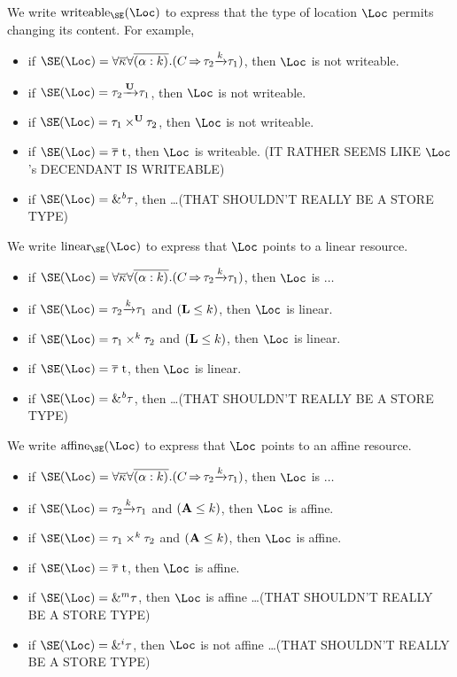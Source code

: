 We write $\Writeable\SE\Loc$ to express that the type of location
$\Loc$ permits changing its content. For example,
\begin{itemize}
\item if $\SE (\Loc) =
  \forall\Multi\kvar\forall\Multi{\bvar{\alpha}{k}}.(\qual{C}{\tau_2\tarr{k}\tau_1})$,
  then $\Loc$ is not writeable.
\item if $\SE (\Loc) = \tau_2\tarr{\kun}{\tau_1}$, then $\Loc$ is not
  writeable.
\item if $\SE (\Loc) = \tyPair[\kun]{\tau_1}{\tau_2}$, then $\Loc$ is not writeable.
\item if $\SE (\Loc) = \tapp{t}{\Multi\tau}$, then $\Loc$ is
  writeable. (IT RATHER SEEMS LIKE $\Loc$'s DECENDANT IS WRITEABLE)
\item if $\SE (\Loc) = \borrow\tau$, then \dots (THAT SHOULDN'T REALLY
  BE A STORE TYPE)
\end{itemize}
We write $\Linear\SE\Loc$ to express that $\Loc$ points to a linear
resource.
\begin{itemize}
\item if $\SE (\Loc) =
  \forall\Multi\kvar\forall\Multi{\bvar{\alpha}{k}}.(\qual{C}{\tau_2\tarr{k}\tau_1})$,
  then $\Loc$ is $\dots$
\item if $\SE (\Loc) = \tau_2\tarr{k}{\tau_1}$ and $(\mathbf{L} \leq k)$, then $\Loc$ is linear.
\item if $\SE (\Loc) = \tyPair[k]{\tau_1}{\tau_2}$ and $(\mathbf{L} \leq k)$, then $\Loc$ is linear.
\item if $\SE (\Loc) = \tapp{t}{\Multi\tau}$, then $\Loc$ is linear.
\item if $\SE (\Loc) = \borrow\tau$, then \dots (THAT SHOULDN'T REALLY
  BE A STORE TYPE)
\end{itemize}
We write $\Affine\SE\Loc$ to express that $\Loc$ points to an affine
resource.
\begin{itemize}
\item if $\SE (\Loc) =
  \forall\Multi\kvar\forall\Multi{\bvar{\alpha}{k}}.(\qual{C}{\tau_2\tarr{k}\tau_1})$,
  then $\Loc$ is $\dots$
\item if $\SE (\Loc) = \tau_2\tarr{k}{\tau_1}$ and $(\mathbf{A} \leq k)$, then $\Loc$ is affine.
\item if $\SE (\Loc) = \tyPair[k]{\tau_1}{\tau_2}$ and $(\mathbf{A} \leq k)$, then $\Loc$ is affine.
\item if $\SE (\Loc) = \tapp{t}{\Multi\tau}$, then $\Loc$ is affine.
\item if $\SE (\Loc) = \borrow[\MBORROW]\tau$, then $\Loc$ is affine
  \dots (THAT SHOULDN'T REALLY  BE A STORE TYPE)
\item if $\SE (\Loc) = \borrow[\IBORROW]\tau$, then $\Loc$ is not affine
  \dots (THAT SHOULDN'T REALLY  BE A STORE TYPE)
\end{itemize}
